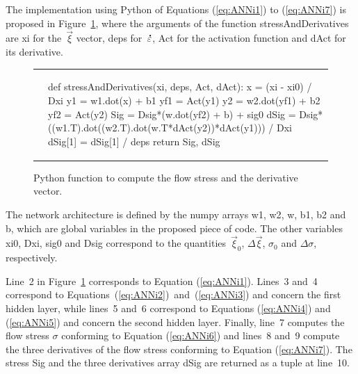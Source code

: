 \documentclass[algorithms,article,accept,pdftex,oneauthor]{Definitions/mdpi}
\DeclareRobustCommand{\mdot}[1]{\accentset{\mbox{\bfseries .}}{#1}}
\DeclareRobustCommand{\var}[1]{\textsf{#1}}
\begin{document}
The implementation using Python of Equations (\ref{eq:ANNi1}) to (\ref{eq:ANNi7}) is proposed in Figure~\ref{fig:PythonStress}, where the arguments of the function \var{stressAndDerivatives} are \var{xi} for the~$\overrightarrow{\xi}$ vector, \var{deps} for~$\mdot{\varepsilon}$, \var{Act} for the activation function and \var{dAct} for its derivative.
\begin{figure}[H]
\begin{tabular}{ll}
 & {\begin{PythonListing}
def stressAndDerivatives(xi, deps, Act, dAct):
  x = (xi - xi0) / Dxi
  y1 = w1.dot(x) + b1
  yf1 = Act(y1)
  y2 = w2.dot(yf1) + b2
  yf2 = Act(y2)
  Sig = Dsig*(w.dot(yf2) + b) + sig0
  dSig = Dsig*((w1.T).dot((w2.T).dot(w.T*dAct(y2))*dAct(y1))) / Dxi
  dSig[1] = dSig[1] / deps
  return Sig, dSig
\end{PythonListing}}
\end{tabular}
\caption{Python %
 function to compute the flow stress and the derivative vector.\label{fig:PythonStress}}
\end{figure}
The network architecture is defined by the numpy arrays \var{w1}, %
 \var{w2}, \var{w}, \var{b1}, \var{b2} and \var{b}, which are global variables in the proposed piece of code.
The other variables \var{xi0}, \var{Dxi}, \var{sig0} and \var{Dsig} correspond to the quantities~$\overrightarrow{\xi}_{0}$, $\Delta\overrightarrow{\xi}$, $\sigma_{0}$ and $\Delta\sigma$, respectively.

{Line~2 in Figure~\ref{fig:PythonStress} corresponds to Equation (\ref{eq:ANNi1}).
Lines~3 and~4 correspond to \mbox{Equations~(\ref{eq:ANNi2})~and~(\ref{eq:ANNi3})} and concern the first hidden layer, while lines~5 and~6 correspond to Equations (\ref{eq:ANNi4}) and (\ref{eq:ANNi5})} and concern the second hidden layer.
Finally, line~7 computes the flow stress $\sigma$ conforming to Equation (\ref{eq:ANNi6}) and lines~8 and~9 compute the three derivatives of the flow stress conforming to Equation (\ref{eq:ANNi7}).
The stress \var{Sig} and the three derivatives array \var{dSig} are returned as a tuple at line~10.
\end{document}
